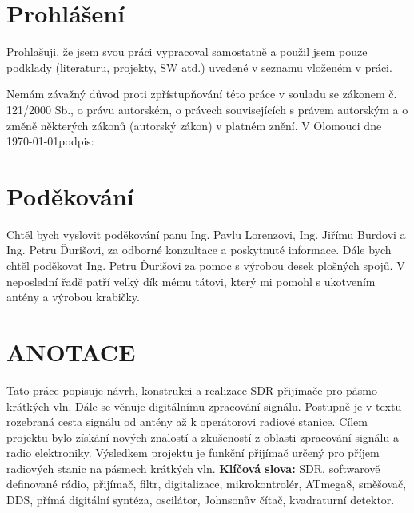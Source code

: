 \clearpage
\vspace*{\fill}
\section*{Prohlášení}
\indent\indent Prohlašuji, že jsem svou práci vypracoval samostatně a použil jsem pouze podklady (literaturu, projekty, SW atd.) uvedené v seznamu vloženém v práci.
		
Nemám závažný důvod proti zpřístupňování této práce v souladu se zákonem č. 121/2000 Sb., o právu autorském, o právech souvisejících s právem autorským a o změně některých zákonů (autorský zákon) v platném znění. 
	\newline\newline
	V Olomouci dne \today\hspace*{4cm}podpis: \dotfill\newline

\clearpage
\vspace*{\fill}	
\section*{Poděkování}
\indent\indent Chtěl bych vyslovit poděkování panu Ing. Pavlu Lorenzovi, Ing. Jiřímu Burdovi a Ing. Petru Ďurišovi, za odborné konzultace a poskytnuté informace. Dále bych chtěl poděkovat Ing. Petru Ďurišovi za pomoc s výrobou desek plošných spojů. V neposlední řadě patří velký dík mému tátovi, který mi pomohl s ukotvením antény a výrobou krabičky.

\clearpage
\section*{ANOTACE}
\indent\indent Tato práce popisuje návrh, konstrukci a realizace SDR přijímače pro pásmo krátkých vln. Dále se věnuje digitálnímu zpracování signálu. Postupně je v textu rozebraná cesta signálu od antény až k operátorovi radiové stanice. Cílem projektu bylo získání nových znalostí a zkušeností z oblasti zpracování signálu a radio elektroniky. Výsledkem projektu je funkční přijímač určený pro příjem radiových stanic na pásmech krátkých vln.
\newline\newline	
\noindent\textbf{Klíčová slova:}
SDR, softwarově definované rádio, přijímač, filtr, digitalizace, mikrokontrolér, ATmega8, směšovač, DDS, přímá digitální syntéza, oscilátor, Johnsonův čítač, kvadraturní detektor.

